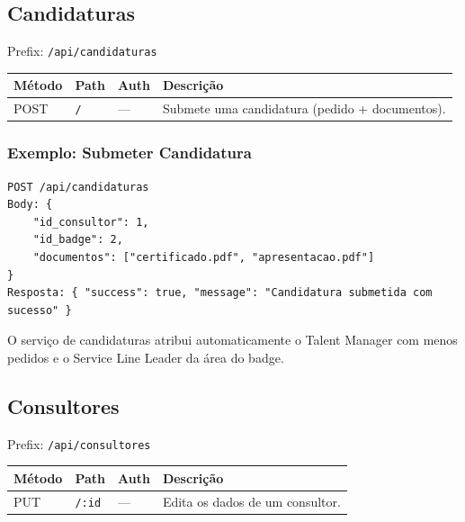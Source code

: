 \documentclass[12pt,a4paper]{article}
\begin{document}
\subsection{Candidaturas}
\label{sec:candidaturas}

Prefix: \texttt{/api/candidaturas}

\begin{longtable}{@{}lllp{6cm}@{}}
    \toprule
    \textbf{Método} & \textbf{Path} & \textbf{Auth} & \textbf{Descrição} \\
    \midrule
    \endhead
    \bottomrule
    \endfoot

    POST & \texttt{/} & --- & Submete uma candidatura (pedido + documentos). \\
\end{longtable}

\subsubsection*{Exemplo: Submeter Candidatura}
\begin{lstlisting}
POST /api/candidaturas
Body: {
    "id_consultor": 1,
    "id_badge": 2,
    "documentos": ["certificado.pdf", "apresentacao.pdf"]
}
Resposta: { "success": true, "message": "Candidatura submetida com sucesso" }
\end{lstlisting}

O serviço de candidaturas atribui automaticamente o Talent Manager com menos pedidos e o Service Line Leader da área do badge.

\subsection{Consultores}
\label{sec:consultores}

Prefix: \texttt{/api/consultores}

\begin{longtable}{@{}lllp{6cm}@{}}
    \toprule
    \textbf{Método} & \textbf{Path} & \textbf{Auth} & \textbf{Descrição} \\
    \midrule
    \endhead
    \bottomrule
    \endfoot

    PUT & \texttt{/:id} & --- & Edita os dados de um consultor. \\
\end{longtable}
\end{document}
